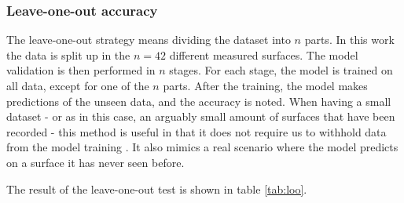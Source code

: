 \subsubsection{Leave-one-out accuracy}
The leave-one-out strategy means dividing the dataset into $n$ parts. In this work the data is split up in the $n=42$ different measured surfaces. The model validation is then performed in $n$ stages. For each stage, the model is trained on all data, except for one of the $n$ parts. After the training, the model makes predictions of the unseen data, and the accuracy is noted. When having a small dataset - or as in this case, an arguably small amount of surfaces that have been recorded - this method is useful in that it does not require us to withhold data from the model training \citep{raschka}. It also mimics a real scenario where the model predicts on a surface it has never seen before.

The result of the leave-one-out test is shown in table \ref{tab:loo}.










